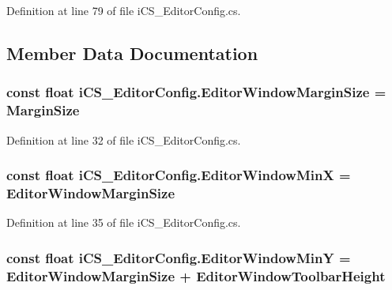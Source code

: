 Definition at line 79 of file i\+C\+S\+\_\+\+Editor\+Config.\+cs.



\subsection{Member Data Documentation}
\hypertarget{classi_c_s___editor_config_a70ca19259290ebd2e0893309f87a8b1b}{
\subsubsection[{Editor\+Window\+Margin\+Size}]{\setlength{\rightskip}{0pt plus 5cm}const float i\+C\+S\+\_\+\+Editor\+Config.\+Editor\+Window\+Margin\+Size = {\bf Margin\+Size}}}\label{classi_c_s___editor_config_a70ca19259290ebd2e0893309f87a8b1b}


Definition at line 32 of file i\+C\+S\+\_\+\+Editor\+Config.\+cs.

\hypertarget{classi_c_s___editor_config_ab348702d8e8329b8497e4b3ac6fab690}{
\subsubsection[{Editor\+Window\+Min\+X}]{\setlength{\rightskip}{0pt plus 5cm}const float i\+C\+S\+\_\+\+Editor\+Config.\+Editor\+Window\+Min\+X = {\bf Editor\+Window\+Margin\+Size}}}\label{classi_c_s___editor_config_ab348702d8e8329b8497e4b3ac6fab690}


Definition at line 35 of file i\+C\+S\+\_\+\+Editor\+Config.\+cs.

\hypertarget{classi_c_s___editor_config_a6485bb3d4e7e1bcbc091f3fec9fc295b}{
\subsubsection[{Editor\+Window\+Min\+Y}]{\setlength{\rightskip}{0pt plus 5cm}const float i\+C\+S\+\_\+\+Editor\+Config.\+Editor\+Window\+Min\+Y = {\bf Editor\+Window\+Margin\+Size} + {\bf Editor\+Window\+Toolbar\+Height}}}\label{classi_c_s___editor_config_a6485bb3d4e7e1bcbc091f3fec9fc295b}


